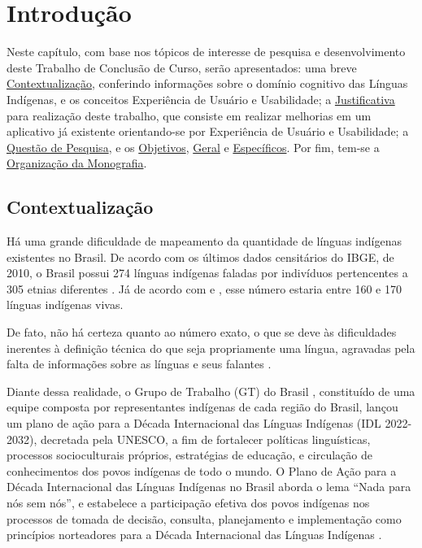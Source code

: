 \chapter[Introdução]{Introdução}
\label{chap:Introducao}

Neste capítulo, com base nos tópicos de interesse de pesquisa e desenvolvimento deste Trabalho de Conclusão de Curso, serão apresentados: uma breve
\hyperref[sec:Contextualização]{Contextualização}, conferindo informações sobre o domínio cognitivo das Línguas Indígenas, e os conceitos Experiência de Usuário e
Usabilidade; a \hyperref[sec:Justificativa]{Justificativa} para realização deste trabalho, que consiste em realizar melhorias em um aplicativo já existente orientando-se por
Experiência de Usuário e Usabilidade; a \hyperref[sec:QuestaodePesquisa]{Questão de Pesquisa}, e os \hyperref[sec:Objetivos]{Objetivos},
\hyperref[sec:ObjetivoGeral]{Geral} e \hyperref[sec:ObjetivosEspecificos]{Específicos}. Por fim, tem-se a \hyperref[sec:OrganizacaodaMonografia]{Organização da Monografia}.

\section{Contextualização}
\label{sec:Contextualização}

Há uma grande dificuldade de mapeamento da quantidade de línguas indígenas existentes no Brasil. De acordo com os últimos dados censitários do IBGE, de 2010, o Brasil
possui 274 línguas indígenas faladas por indivíduos pertencentes a 305 etnias diferentes \cite{ibge}. Já de acordo com  e , esse
número estaria entre 160 e 170 línguas indígenas vivas.

De fato, não há certeza quanto ao número exato, o que se deve às dificuldades inerentes à definição técnica do que seja propriamente uma língua, agravadas pela falta de
informações sobre as línguas e seus falantes \cite{seki2000}.

Diante dessa realidade, o Grupo de Trabalho (GT) do Brasil \cite{gtbrasil2021}, constituído de uma equipe composta por representantes indígenas de cada região do Brasil,
lançou um plano de ação para a Década Internacional das Línguas Indígenas (IDL 2022-2032), decretada pela UNESCO, a fim de fortalecer políticas linguísticas, processos
socioculturais próprios, estratégias de educação, e circulação de conhecimentos dos povos indígenas de todo o mundo. O Plano de Ação para a Década Internacional das
Línguas Indígenas no Brasil aborda o lema “Nada para nós sem nós”, e estabelece a participação efetiva dos povos indígenas nos processos de tomada de decisão, consulta,
planejamento e implementação como princípios norteadores para a Década Internacional das Línguas Indígenas \cite{gtbrasil2021}.

